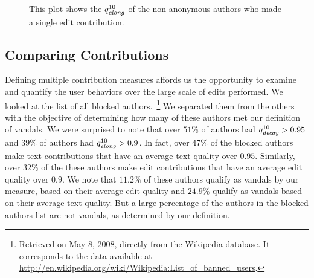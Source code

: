 \begin{figure}[tbph]
    \begin{center}
    \end{center}
    \caption[Edit quality of authors with one edit]{
        This plot shows the $\quality{elong}{10}{}$ of the
	non-anonymous authors who made a single edit contribution.
    }
    \label{fig-singles-quality}
\end{figure}






\subsection{Comparing Contributions}

Defining multiple contribution measures affords us
the opportunity to examine and quantify the
user behaviors over the large scale of edits performed.
We looked at the list of all blocked authors.~\footnote{Retrieved
on May 8, 2008, directly from the Wikipedia database.
It corresponds to the data available at
\url{http://en.wikipedia.org/wiki/Wikipedia:List_of_banned_users}.}
We separated them from the others with the objective of determining 
how many of these authors met our definition of vandals.
We were surprised to note that over $51\%$ of authors had 
$\quality{decay}{10}{} > 0.95$ and $39\%$ of authors had 
$\quality{elong}{10}{} > 0.9$.
In fact, over $47\%$ of the blocked authors make text contributions 
that have an average text quality over $0.95$.
Similarly, over $32\%$ of the these authors make edit contributions
that have an average edit quality over $0.9$.
We note that $11.2\%$ of these authors qualify as vandals by our measure,
based on their average edit quality and $24.9\%$ qualify as vandals
based on their average text quality.
But a large percentage of the authors in the blocked authors 
list are not vandals, as determined by our definition.


